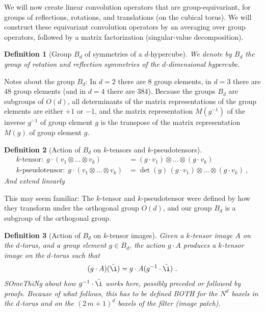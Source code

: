 \documentclass{article}
\theoremstyle{plain}
\newtheorem{definition}{Definition}
\begin{document}
We will now create linear convolution operators that are group-equivariant, for groups of reflections, rotations, and translations (on the cubical torus).
We will construct these equivariant convolution operators by an averaging over group operators, followed by a matrix factorization (singular-value decomposition).

\begin{definition}[Group $B_d$ of symmetries of a $d$-hypercube]
We denote by $B_d$ the group of rotation and reflection symmetries of the $d$-dimensional hypercube.
\end{definition}

Notes about the group $B_d$: In $d=2$ there are $8$ group elements, in $d=3$ there are $48$ group elements (and in $d=4$ there are 384). Because the groups $B_d$ are subgroups of $O(d)$, all determinants of the matrix representations of the group elements are either $+1$ or $-1$, and the matrix representation $M(g^{-1})$ of the inverse $g^{-1}$ of group element $g$ is the transpose of the matrix representation $M(g)$ of group element $g$.

\begin{definition}[Action of $B_d$ on $k$-tensors and $k$-pseudotensors]
\begin{align}
\mbox{$k$-tensor:} ~~ g\cdot(v_1 \otimes \ldots \otimes v_k) &= (g\cdot v_1)\otimes\ldots\otimes(g\cdot v_k) \\
\mbox{$k$-pseudotensor:} ~~ g\cdot(v_1 \otimes \ldots \otimes v_k) &= \det(g)\,(g\cdot v_1)\otimes\ldots\otimes(g\cdot v_k) ~,
\end{align}
And extend linearly
\end{definition}

This may seem familiar: The $k$-tensor and $k$-pseudotensor were defined by how they transform under the orthogonal group $O(d)$, and our group $B_d$ is a subgroup of the orthogonal group.

\begin{definition}[Action of $B_d$ on $k$-tensor images]
Given a $k$-tensor image $A$ on the $d$-torus, and a group element $g\in B_d$, the action $g\cdot A$ produces a $k$-tensor image on the $d$-torus such that
\begin{equation}
    (g\cdot A)(\bar\i) = g\cdot A({g^{-1}\cdot \bar\i}) ~.
\end{equation}
SOmeThiNg about how $g^{-1}\cdot\bar\i$ works here, possibly preceded or followed by proofs. Because of what follows, this has to be defined BOTH for the $N^d$ boxels in the $d$-torus and on the $(2\,m+1)^d$ boxels of the filter (image patch).
\end{definition}
\end{document}
